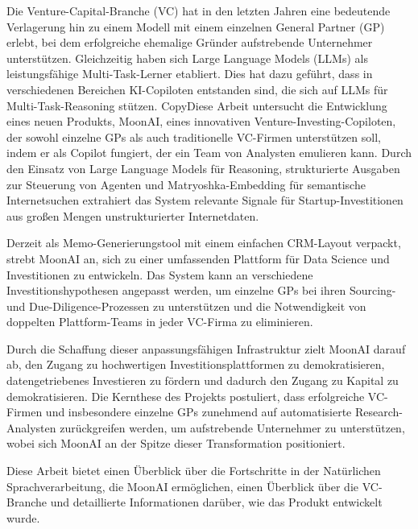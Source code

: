 \documentclass[a4paper, oneside]{discothesis}
\begin{document}
\begin{zusammenfassung}
Die Venture-Capital-Branche (VC) hat in den letzten Jahren eine bedeutende Verlagerung hin zu einem Modell mit einem einzelnen General Partner (GP) erlebt, bei dem erfolgreiche ehemalige Gründer aufstrebende Unternehmer unterstützen.
Gleichzeitig haben sich Large Language Models (LLMs) als leistungsfähige Multi-Task-Lerner etabliert. Dies hat dazu geführt, dass in verschiedenen Bereichen KI-Copiloten entstanden sind, die sich auf LLMs für Multi-Task-Reasoning stützen.
CopyDiese Arbeit untersucht die Entwicklung eines neuen Produkts, MoonAI, eines innovativen Venture-Investing-Copiloten, der sowohl einzelne GPs als auch traditionelle VC-Firmen unterstützen soll, indem er als Copilot fungiert, der ein Team von Analysten emulieren kann.
Durch den Einsatz von Large Language Models für Reasoning, strukturierte Ausgaben zur Steuerung von Agenten und Matryoshka-Embedding für semantische Internetsuchen extrahiert das System relevante Signale für Startup-Investitionen aus großen Mengen unstrukturierter Internetdaten.

Derzeit als Memo-Generierungstool mit einem einfachen CRM-Layout verpackt, strebt MoonAI an, sich zu einer umfassenden Plattform für Data Science und Investitionen zu entwickeln. Das System kann an verschiedene Investitionshypothesen angepasst werden, um einzelne GPs bei ihren Sourcing- und Due-Diligence-Prozessen zu unterstützen und die Notwendigkeit von doppelten Plattform-Teams in jeder VC-Firma zu eliminieren.

Durch die Schaffung dieser anpassungsfähigen Infrastruktur zielt MoonAI darauf ab, den Zugang zu hochwertigen Investitionsplattformen zu demokratisieren, datengetriebenes Investieren zu fördern und dadurch den Zugang zu Kapital zu demokratisieren. Die Kernthese des Projekts postuliert, dass erfolgreiche VC-Firmen und insbesondere einzelne GPs zunehmend auf automatisierte Research-Analysten zurückgreifen werden, um aufstrebende Unternehmer zu unterstützen, wobei sich MoonAI an der Spitze dieser Transformation positioniert.

Diese Arbeit bietet einen Überblick über die Fortschritte in der Natürlichen Sprachverarbeitung, die MoonAI ermöglichen, einen Überblick über die VC-Branche und detaillierte Informationen darüber, wie das Produkt entwickelt wurde.
\end{zusammenfassung}

\tableofcontents

\mainmatter %
\end{document}
